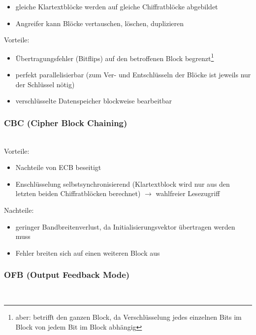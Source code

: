 \documentclass[a4paper,twoside,DIV15,BCOR12mm]{scrbook}
\begin{document}
\begin{itemize}
	\item gleiche Klartextblöcke werden auf gleiche Chiffratblöcke abgebildet
	\item Angreifer kann Blöcke vertauschen, löschen, duplizieren
\end{itemize}

Vorteile:

\begin{itemize}
	\item Übertragungsfehler (Bitflips) auf den betroffenen Block begrenzt\footnote{aber: betrifft den ganzen Block, da Verschlüsselung jedes einzelnen Bits im Block von jedem Bit im Block abhängig}
	\item perfekt parallelisierbar (zum Ver- und Entschlüsseln der Blöcke ist jeweils nur der Schlüssel nötig)
	\item verschlüsselte Datenspeicher blockweise bearbeitbar
\end{itemize}

\subsubsection{CBC (Cipher Block Chaining)}

\\

Vorteile:

\begin{itemize}
	\item Nachteile von ECB beseitigt
	\item Enschlüsselung selbstsynchronisierend (Klartextblock wird nur aus den letzten beiden Chiffratblöcken berechnet) $\rightarrow$ wahlfreier Lesezugriff
\end{itemize}

Nachteile:

\begin{itemize}
	\item geringer Bandbreitenverlust, da Initialisierungsvektor übertragen werden muss
	\item Fehler breiten sich auf einen weiteren Block aus
\end{itemize}

\subsubsection{OFB (Output Feedback Mode)}

\\
\end{document}
